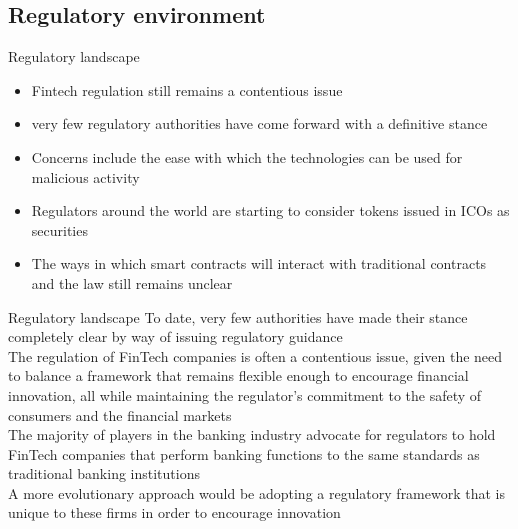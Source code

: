 \documentclass[11pt]{beamer}
\begin{document}

\subsection{Regulatory environment}

\begin{frame}{Regulatory landscape}
	\begin{itemize}
		\item Fintech regulation still remains a contentious issue
		\item very few regulatory authorities have come forward with a definitive stance
		\item Concerns include the ease with which the technologies can be used for malicious activity
		\item Regulators around the world are starting to consider tokens issued in ICOs as securities
		\item The ways in which smart contracts will interact with traditional contracts and the law still remains unclear
	\end{itemize}
\end{frame}



\begin{frame}{Regulatory landscape}
	To date, very few authorities have made their stance completely clear by way of issuing regulatory guidance \\ \vspace{3mm}
	The regulation of FinTech companies is often a contentious issue, given the need to balance a framework that remains flexible enough to encourage financial innovation, all while maintaining the regulator's commitment to the safety of consumers and the financial markets  \\ \vspace{3mm}
	The majority of players in the banking industry advocate for regulators to hold FinTech companies that perform banking functions to the same standards as traditional banking institutions \\ \vspace{3mm}
	A more evolutionary approach would be adopting a regulatory framework that is unique to these firms in order to encourage innovation
\end{frame}

\end{document}
